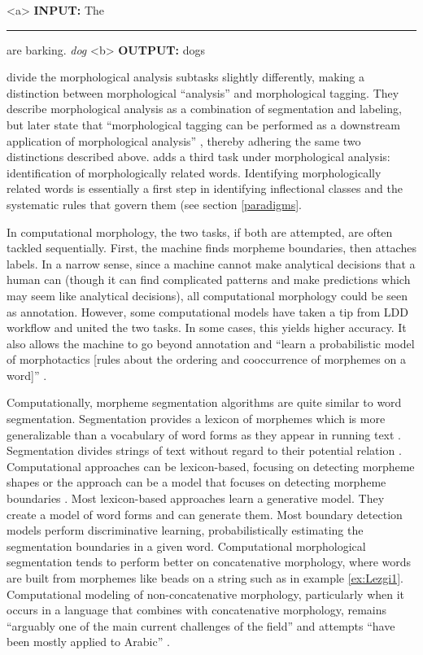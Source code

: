 \documentclass[12pt]{article}
\begin{document}
\begin{singlespace}
\label{ex:ConLL-T2}
\a<a> \textbf{INPUT:}  The \rule{1cm}{0.15mm} are barking.  \hspace{5 mm} \textit{dog}
\label{ex:ConLL-T2a}
\a<b> \textbf{OUTPUT:} dogs
\label{ex:ConLL-T2b}
\xe
\end{singlespace}

 divide the morphological analysis subtasks slightly differently, making a distinction between morphological “analysis” and morphological tagging. They describe morphological analysis as a combination of segmentation and labeling, but later state that ``morphological tagging can be performed as a downstream application of morphological analysis'' , thereby adhering the same two distinctions described above.  adds a third task under morphological analysis: identification of morphologically related words. Identifying morphologically related words is essentially a first step in identifying inflectional classes and the systematic rules that govern them (see section \ref{paradigms}. 

In computational morphology, the two tasks, if both are attempted, are often tackled sequentially. First, the machine finds morpheme boundaries, then attaches labels. In a narrow sense, since a machine cannot make analytical decisions that a human can (though it can find complicated patterns and make predictions which may seem like analytical decisions), all computational morphology could be seen as annotation. However, some computational models have taken a tip from LDD workflow and united the two tasks. In some cases, this yields higher accuracy. It also allows the machine to go beyond annotation and ``learn a probabilistic model of morphotactics [rules about the ordering and cooccurrence of morphemes on a word]'' \cite[page 165]{cotterell_labeled_2015}.

Computationally, morpheme segmentation algorithms are quite similar to word segmentation. Segmentation provides a lexicon of morphemes which is more generalizable than a vocabulary of word forms as they appear in running text \cite{creutz_unsupervised_2002}. Segmentation divides strings of text without regard to their potential relation \cite{virpioja_empirical_2011}. Computational approaches can be lexicon-based, focusing on detecting morpheme shapes or the approach can be a model that focuses on detecting morpheme boundaries \cite{goodman_generation_2013}. Most lexicon-based approaches learn a generative model. They create a model of word forms and can generate them. Most boundary detection models perform discriminative learning, probabilistically estimating the segmentation boundaries in a given word. Computational morphological segmentation tends to perform better on concatenative morphology, where words are built from morphemes like beads on a string such as in example \ref{ex:Lezgi1}. Computational modeling of non-concatenative morphology, particularly when it occurs in a language that combines with concatenative morphology, remains ``arguably one of the main current challenges of the field'' and attempts ``have been mostly applied to Arabic'' \cite{goldsmith_computational_2017}. 
\end{document}
